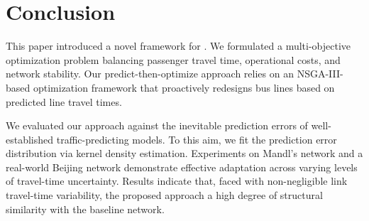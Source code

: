 \documentclass[a4paper,fleqn]{cas-sc}
\begin{document}

\section{Conclusion}\label{sec:conclu}
This paper introduced a novel framework for . We formulated a multi-objective optimization problem balancing passenger travel time, operational costs, and network stability. Our predict-then-optimize approach relies on an NSGA-III-based optimization framework that proactively redesigns bus lines based on predicted line travel times. 

We evaluated our approach against the inevitable prediction errors of well-established traffic-predicting models. To this aim, we fit the prediction error distribution via kernel density estimation.
Experiments on Mandl's network and a real-world Beijing network demonstrate effective adaptation across varying levels of travel-time uncertainty. 
%
Results indicate that, faced with non-negligible link travel-time variability, the proposed approach  a high degree of structural similarity with the baseline network.
%
\end{document}
